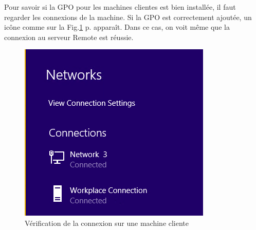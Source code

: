Pour savoir si la GPO pour les machines clientes est bien installée, il faut regarder les connexions de la machine.
Si la GPO est correctement ajoutée, un icône comme sur la Fig.\ref{fig:clientDA} p.\pageref{fig:clientDA} apparaît.
Dans ce cas, on voit même que la connexion au serveur Remote est réussie.
\begin{figure}[ht]
	\centering
	\includegraphics{DA/ClientConnexion.png}
	\caption{Vérification de la connexion sur une machine cliente}
	\label{fig:clientDA}
\end{figure} 